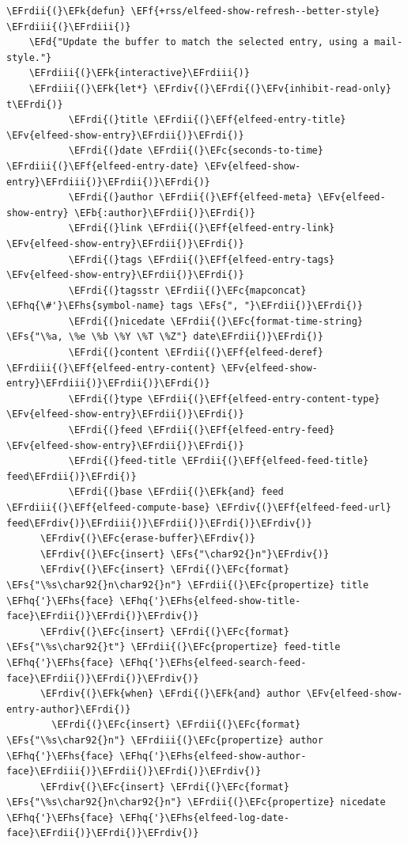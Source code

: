 \documentclass{scrartcl}
\newcommand{\EFk}[1]{\textcolor{EFk}{#1}} %
\newcommand{\EFd}[1]{\textcolor{EFd}{#1}} %
\newcommand{\EFs}[1]{\textcolor{EFs}{#1}} %
\newcommand{\EFb}[1]{\textcolor{EFb}{#1}} %
\newcommand{\EFc}[1]{\textcolor{EFc}{#1}} %
\newcommand{\EFv}[1]{\textcolor{EFv}{#1}} %
\newcommand{\EFf}[1]{\textcolor{EFf}{#1}} %
\newcommand{\EFhq}[1]{#1} %
\newcommand{\EFhs}[1]{#1} %
\newcommand{\EFrdi}[1]{#1} %
\newcommand{\EFrdii}[1]{#1} %
\newcommand{\EFrdiii}[1]{#1} %
\newcommand{\EFrdiv}[1]{#1} %
\begin{document}
\begin{Code}
\begin{Verbatim}[]
  \EFrdii{(}\EFk{defun} \EFf{+rss/elfeed-show-refresh--better-style} \EFrdiii{(}\EFrdiii{)}
    \EFd{"Update the buffer to match the selected entry, using a mail-style."}
    \EFrdiii{(}\EFk{interactive}\EFrdiii{)}
    \EFrdiii{(}\EFk{let*} \EFrdiv{(}\EFrdi{(}\EFv{inhibit-read-only} t\EFrdi{)}
           \EFrdi{(}title \EFrdii{(}\EFf{elfeed-entry-title} \EFv{elfeed-show-entry}\EFrdii{)}\EFrdi{)}
           \EFrdi{(}date \EFrdii{(}\EFc{seconds-to-time} \EFrdiii{(}\EFf{elfeed-entry-date} \EFv{elfeed-show-entry}\EFrdiii{)}\EFrdii{)}\EFrdi{)}
           \EFrdi{(}author \EFrdii{(}\EFf{elfeed-meta} \EFv{elfeed-show-entry} \EFb{:author}\EFrdii{)}\EFrdi{)}
           \EFrdi{(}link \EFrdii{(}\EFf{elfeed-entry-link} \EFv{elfeed-show-entry}\EFrdii{)}\EFrdi{)}
           \EFrdi{(}tags \EFrdii{(}\EFf{elfeed-entry-tags} \EFv{elfeed-show-entry}\EFrdii{)}\EFrdi{)}
           \EFrdi{(}tagsstr \EFrdii{(}\EFc{mapconcat} \EFhq{\#'}\EFhs{symbol-name} tags \EFs{", "}\EFrdii{)}\EFrdi{)}
           \EFrdi{(}nicedate \EFrdii{(}\EFc{format-time-string} \EFs{"\%a, \%e \%b \%Y \%T \%Z"} date\EFrdii{)}\EFrdi{)}
           \EFrdi{(}content \EFrdii{(}\EFf{elfeed-deref} \EFrdiii{(}\EFf{elfeed-entry-content} \EFv{elfeed-show-entry}\EFrdiii{)}\EFrdii{)}\EFrdi{)}
           \EFrdi{(}type \EFrdii{(}\EFf{elfeed-entry-content-type} \EFv{elfeed-show-entry}\EFrdii{)}\EFrdi{)}
           \EFrdi{(}feed \EFrdii{(}\EFf{elfeed-entry-feed} \EFv{elfeed-show-entry}\EFrdii{)}\EFrdi{)}
           \EFrdi{(}feed-title \EFrdii{(}\EFf{elfeed-feed-title} feed\EFrdii{)}\EFrdi{)}
           \EFrdi{(}base \EFrdii{(}\EFk{and} feed \EFrdiii{(}\EFf{elfeed-compute-base} \EFrdiv{(}\EFf{elfeed-feed-url} feed\EFrdiv{)}\EFrdiii{)}\EFrdii{)}\EFrdi{)}\EFrdiv{)}
      \EFrdiv{(}\EFc{erase-buffer}\EFrdiv{)}
      \EFrdiv{(}\EFc{insert} \EFs{"\char92{}n"}\EFrdiv{)}
      \EFrdiv{(}\EFc{insert} \EFrdi{(}\EFc{format} \EFs{"\%s\char92{}n\char92{}n"} \EFrdii{(}\EFc{propertize} title \EFhq{'}\EFhs{face} \EFhq{'}\EFhs{elfeed-show-title-face}\EFrdii{)}\EFrdi{)}\EFrdiv{)}
      \EFrdiv{(}\EFc{insert} \EFrdi{(}\EFc{format} \EFs{"\%s\char92{}t"} \EFrdii{(}\EFc{propertize} feed-title \EFhq{'}\EFhs{face} \EFhq{'}\EFhs{elfeed-search-feed-face}\EFrdii{)}\EFrdi{)}\EFrdiv{)}
      \EFrdiv{(}\EFk{when} \EFrdi{(}\EFk{and} author \EFv{elfeed-show-entry-author}\EFrdi{)}
        \EFrdi{(}\EFc{insert} \EFrdii{(}\EFc{format} \EFs{"\%s\char92{}n"} \EFrdiii{(}\EFc{propertize} author \EFhq{'}\EFhs{face} \EFhq{'}\EFhs{elfeed-show-author-face}\EFrdiii{)}\EFrdii{)}\EFrdi{)}\EFrdiv{)}
      \EFrdiv{(}\EFc{insert} \EFrdi{(}\EFc{format} \EFs{"\%s\char92{}n\char92{}n"} \EFrdii{(}\EFc{propertize} nicedate \EFhq{'}\EFhs{face} \EFhq{'}\EFhs{elfeed-log-date-face}\EFrdii{)}\EFrdi{)}\EFrdiv{)}

\end{Verbatim}
\end{Code}
\end{document}
